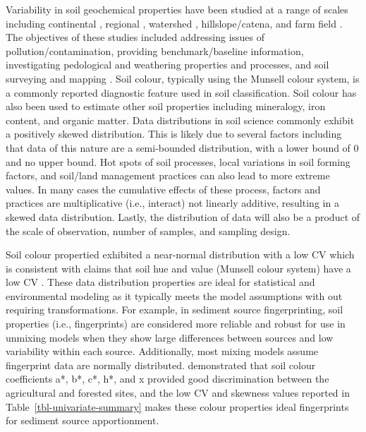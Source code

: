 \documentclass[
  number]{elsarticle}
\begin{document}
Variability in soil geochemical properties have been studied at a range
of scales including continental \citep{drew2010}, regional
\citep{rattenbury2018}, watershed \citep{nanos2012}, hillslope/catena,
and farm field \citep{sun2021a}. The objectives of these studies
included addressing issues of pollution/contamination, providing
benchmark/baseline information, investigating pedological and weathering
properties and processes, and soil surveying and mapping
\citep{wilson2008}. Soil colour, typically using the Munsell colour
system, is a commonly reported diagnostic feature used in soil
classification. Soil colour has also been used to estimate other soil
properties including mineralogy, iron content, and organic matter. Data
distributions in soil science commonly exhibit a positively skewed
distribution. This is likely due to several factors including that data
of this nature are a semi-bounded distribution, with a lower bound of 0
and no upper bound. Hot spots of soil processes, local variations in
soil forming factors, and soil/land management practices can also lead
to more extreme values. In many cases the cumulative effects of these
process, factors and practices are multiplicative (i.e., interact) not
linearly additive, resulting in a skewed data distribution. Lastly, the
distribution of data will also be a product of the scale of observation,
number of samples, and sampling design.

Soil colour propertied exhibited a near-normal distribution with a low
CV which is consistent with claims that soil hue and value (Munsell
colour system) have a low CV \citep{pennock2008}. These data
distribution properties are ideal for statistical and environmental
modeling as it typically meets the model assumptions with out requiring
transformations. For example, in sediment source fingerprinting, soil
properties (i.e., fingerprints) are considered more reliable and robust
for use in unmixing models when they show large differences between
sources and low variability within each source. Additionally, most
mixing models assume fingerprint data are normally distributed.
\citep{lunamiño2024} demonstrated that soil colour coefficients a*, b*,
c*, h*, and x provided good discrimination between the agricultural and
forested sites, and the low CV and skewness values reported in
Table~\ref{tbl-univariate-summary} makes these colour properties ideal
fingerprints for sediment source apportionment.
\end{document}
